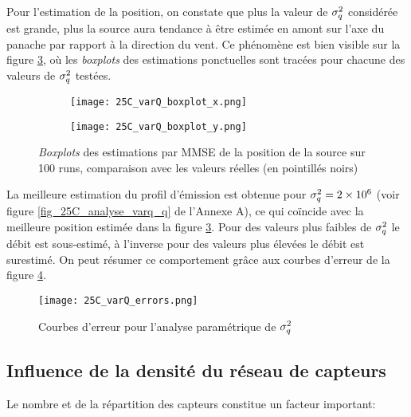 Pour l'estimation de la position, on constate que plus la valeur de $\sigma_q^2$ considérée est grande, plus la source aura tendance à être estimée en amont sur l'axe du panache par rapport à la direction du vent. Ce phénomène est bien visible sur la figure \ref{fig_25C_varQ_boxplots}, où les \textit{boxplots} des estimations ponctuelles sont tracées pour chacune des valeurs de $\sigma_q^2$ testées.

\begin{figure}[h!]
	\centering
         	\begin{subfigure}[t]{0.5\textwidth}
         		\centering
         		\texttt{[image: 25C\_varQ\_boxplot\_x.png]}
         		\caption{}
         		\label{varQ_boxplot_x}
         	\end{subfigure}%
         \begin{subfigure}[t]{0.5\textwidth}
         	\centering
         	\texttt{[image: 25C\_varQ\_boxplot\_y.png]}
         	\caption{}
         	\label{varQ_boxplot_y}
         \end{subfigure}%
         \caption{\textit{Boxplots} des estimations par MMSE de la position de la source sur 100 runs, comparaison avec les valeurs réelles (en pointillés noirs)}
         \label{fig_25C_varQ_boxplots}
	
\end{figure}

La meilleure estimation du profil d'émission est obtenue pour $\sigma_q^2=2\times 10^6$ (voir figure \ref{fig_25C_analyse_varq_q} de l'Annexe A), ce qui coïncide avec la meilleure position estimée dans la figure \ref{fig_25C_varQ_boxplots}. Pour des valeurs plus faibles de $\sigma_q^2$ le débit est sous-estimé, à l'inverse pour des valeurs plus élevées le débit est surestimé. On peut résumer ce comportement grâce aux courbes d'erreur de la figure \ref{fig_25C_varq_erreurs}.

         \begin{figure}[h!]
         	\centering
         	\texttt{[image: 25C\_varQ\_errors.png]}
         	\caption{Courbes d'erreur pour l'analyse paramétrique de $\sigma_q^2$}
         	\label{fig_25C_varq_erreurs}
         \end{figure}

\subsection{Influence de la densité du réseau de capteurs}

Le nombre et de la répartition des capteurs constitue un facteur important: 

